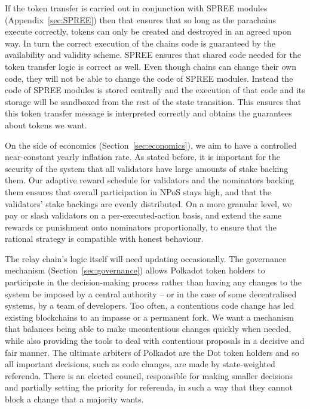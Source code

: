 \documentclass{article}
\begin{document}
If the token transfer is carried out in conjunction with SPREE modules (Appendix~\ref{sec:SPREE}) then that ensures that so long as the parachains execute correctly, tokens can only be created and destroyed in an agreed upon way. In turn the correct execution of the chains code is guaranteed by the availability and validity scheme. SPREE ensures that shared code needed for the token transfer logic is correct as well. Even though chains can change their own code, they will not be able to change the code of SPREE modules. Instead the code of SPREE modules is stored centrally and the execution of that code and its storage will be sandboxed from the rest of the state transition. This ensures that this token transfer message is interpreted correctly and obtains the guarantees about tokens we want. %

On the side of economics (Section~\ref{sec:economics}), we aim to have a controlled near-constant yearly inflation rate. As stated before, it is important for the security of the system that all validators have large amounts of stake backing them. Our adaptive reward schedule for validators and the nominators backing them ensures that overall participation in NPoS stays high, and that the validators' stake backings are evenly distributed. On a more granular level, we pay or slash validators on a per-executed-action basis, and extend the same rewards or punishment onto nominators proportionally, to ensure that the rational strategy is compatible with honest behaviour.

The relay chain's logic itself will need updating occasionally. The governance mechanism (Section~\ref{sec:governance}) allows Polkadot token holders to participate in the decision-making process rather than having any changes to the system be imposed by a central authority -- or in the case of some decentralised systems, by a team of developers. Too often, a contentious code change has led existing blockchains to an impasse or a permanent fork. 
We want a mechanism that balances being able to make uncontentious changes quickly when needed, while also providing the tools to deal with contentious proposals in a decisive and fair manner. The ultimate arbiters of Polkadot are the Dot token holders and so all important decisions, such as code changes, are made by state-weighted referenda. There is an elected council, responsible for making smaller decisions and partially setting the priority for referenda, in such a way that they cannot block a change that a majority wants.
\end{document}
